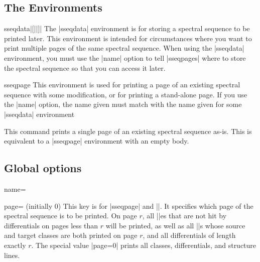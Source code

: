 \documentclass{ltxdoc}
\begin{document}
\begin{sseqdata}[name=ex1,degree={#1}{1-#1}]
\section{The Environments}
\begin{environment}{{sseqdata}|[||]|}
The |sseqdata| environment is for storing a spectral sequence to be printed later. This environment is intended for circumstances where you want to print multiple pages of the same spectral sequence. When using the |sseqdata| environment, you must use the |name| option to tell |sseqpages| where to store the spectral sequence so that you can access it later.
\end{environment}

\begin{environment}{{sseqpage}}
This environment is used for printing a page of an existing spectral sequence with some modification, or for printing a stand-alone page. If you use the |name| option, the name given must match with the name given for some |sseqdata| environment
\end{environment}

\begin{command}{}
This command prints a single page of an existing spectral sequence as-is. This is equivalent to a |sseqpage| environment with an empty body.
\end{command}

\subsection{Global options}
\begin{key}{name=}
\end{key}

\begin{key}{page= (initially 0)}
This key is for |sseqpage| and |\printpage|. It specifies which page of the spectral sequence is to be printed. On page $r$, all |\class|es that are not hit by differentials on pages less than $r$ will be printed, as well as all |\structline|s whose source and target classes are both printed on page $r$, and all differentials of length exactly $r$. The special value |page=0| prints all classes, differentials, and structure lines.
\end{key}

\end{sseqdata}
\end{document}
